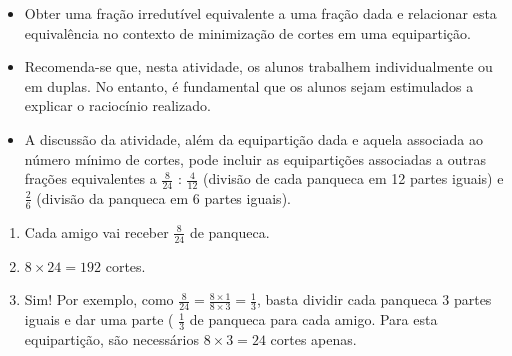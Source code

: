 \begin{atividade}\label{chap4-ativ16}
\objetivos
\begin{itemize} %
    \item       Obter uma fração irredutível equivalente a uma fração dada e
relacionar esta equivalência no contexto de minimização de cortes em uma
equipartição.
\end{itemize} %

\discussoes
\begin{itemize} %
    \item       Recomenda-se que, nesta atividade, os alunos trabalhem
individualmente ou em duplas. No entanto, é fundamental que os alunos sejam
estimulados a explicar o raciocínio realizado.
    \item       A discussão da atividade, além da equipartição dada e aquela
associada ao número mínimo de cortes, pode incluir as equipartições associadas a
outras frações equivalentes a       $\frac{8}{24}$      :       $\frac{4}{12}$
    (divisão de cada panqueca em 12 partes iguais) e       $\frac{2}{6}$
(divisão da panqueca em 6 partes iguais).
\end{itemize} %

\solucao
\begin{enumerate} %
    \item       Cada amigo vai receber       $\frac{8}{24}$       de panqueca.
    \item             $8 \times 24 = 192$       cortes.
    \item       Sim! Por exemplo, como       $\frac{8}{24} = \frac{8 \times 1}{8
\times 3} = \frac{1}{3}$, basta dividir cada panqueca       $3$       partes
iguais e dar uma parte (      $\frac{1}{3}$       de panqueca para cada amigo.
Para esta equipartição, são necessários       $8 \times 3 = 24$       cortes
apenas.
\end{enumerate} %

\end{atividade}


